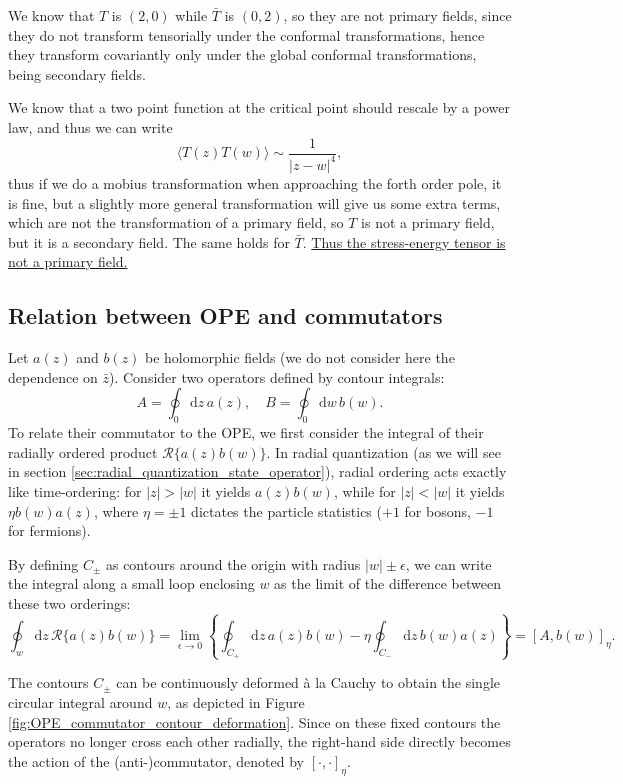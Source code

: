 We know that \(T\) is \((2,0)\) while \(\bar{T}\) is \((0,2)\), so they are not primary fields, since they do not transform tensorially under the conformal transformations, hence they transform covariantly only under the global conformal transformations, being secondary fields.

We know that a two point function at the critical point should rescale by a power law, and thus we can write
\[
    \langle T(z)T(w)\rangle \sim \frac{1}{\vert z- w \vert^4},
\]
thus if we do a mobius transformation when approaching the forth order pole, it is fine, but a slightly more general transformation will give us some extra terms, which are not the transformation of a primary field, so \(T\) is not a primary field, but it is a secondary field. The same holds for \(\bar{T}\). \uline{Thus the stress-energy tensor is not a primary field.}

\subsection{Relation between OPE and commutators}

Let \(a(z)\) and \(b(z)\) be holomorphic fields (we do not consider here the dependence on \(\bar{z}\)). Consider two operators defined by contour integrals:
\[
    A = \oint_0 \mathrm{d}z \, a(z), \quad B = \oint_0 \mathrm{d}w \, b(w).
\]
To relate their commutator to the OPE, we first consider the integral of their radially ordered product \(\mathcal{R}\{a(z)b(w)\}\). In radial quantization (as we will see in section \ref{sec:radial_quantization_state_operator}), radial ordering acts exactly like time-ordering: for \(|z| > |w|\) it yields \(a(z)b(w)\), while for \(|z| < |w|\) it yields \(\eta b(w)a(z)\), where \(\eta = \pm 1\) dictates the particle statistics (\(+1\) for bosons, \(-1\) for fermions).

By defining \(C_\pm\) as contours around the origin with radius \(|w| \pm \epsilon\), we can write the integral along a small loop enclosing \(w\) as the limit of the difference between these two orderings:
\[
    \oint_w \mathrm{d}z \, \mathcal{R}\{a(z)b(w)\} = \lim_{\epsilon \to 0} \left\{ \oint_{C_+} \mathrm{d}z \, a(z)b(w) - \eta \oint_{C_-} \mathrm{d}z \, b(w)a(z) \right\} = [A, b(w)]_\eta.
\]

The contours \(C_\pm\) can be continuously deformed à la Cauchy to obtain the single circular integral around \(w\), as depicted in Figure \ref{fig:OPE_commutator_contour_deformation}. Since on these fixed contours the operators no longer cross each other radially, the right-hand side directly becomes the action of the (anti-)commutator, denoted by \([\cdot, \cdot]_\eta\).

